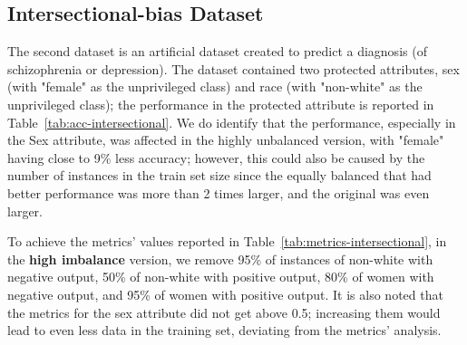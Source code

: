 \documentclass[12pt]{article}
\begin{document}
\subsection{Intersectional-bias Dataset}
\label{sec:intersectional}
The second dataset is an artificial dataset created to predict a diagnosis (of schizophrenia or depression). The dataset contained two protected attributes, sex (with "female" as the unprivileged class) and race (with "non-white" as the unprivileged class); the performance in the protected attribute is reported in Table~\ref{tab:acc-intersectional}. We do identify that the performance, especially in the Sex attribute, was affected in the highly unbalanced version, with "female" having close to 9\% less accuracy; however, this could also be caused by the number of instances in the train set size since the equally balanced that had better performance was more than 2 times larger, and the original was even larger. 

To achieve the metrics' values reported in Table~\ref{tab:metrics-intersectional}, in the \textbf{high imbalance} version, we remove 95\% of instances of non-white with negative output, 50\% of non-white with positive output, 80\% of women with negative output, and 95\% of women with positive output. It is also noted that the metrics for the sex attribute did not get above 0.5; increasing them would lead to even less data in the training set, deviating from the metrics' analysis.

\end{document}

